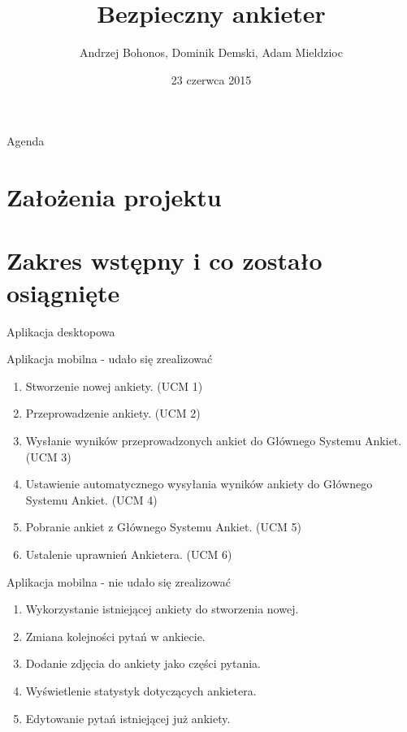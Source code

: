 \documentclass[a4paper,10pt]{beamer}
\date{23 czerwca 2015}
\title{Bezpieczny ankieter}
\author[A. Bohonos, D. Demski, A. Mieldzioc]{Andrzej Bohonos, Dominik Demski, Adam Mieldzioc}
\begin{document}
		\begin{frame}
			\titlepage
		\end{frame}
		\begin{frame}{Agenda}
			\tableofcontents
		\end{frame}
		
		\section{Założenia projektu}
		\begin{frame}
		
		\end{frame}
	
		\section{Zakres wstępny i co zostało osiągnięte}
	
		\begin{frame}{Aplikacja desktopowa}
		\end{frame}
	
		\begin{frame}{Aplikacja mobilna - udało się zrealizować}
			\begin{enumerate}
				\item Stworzenie nowej ankiety. (UCM 1)
				\item	Przeprowadzenie ankiety. (UCM 2)
				\item	Wysłanie wyników przeprowadzonych ankiet do Głównego Systemu Ankiet. (UCM 3)
				\item	Ustawienie automatycznego wysyłania wyników ankiety do Głównego Systemu Ankiet. (UCM 4)
				\item	Pobranie ankiet z Głównego Systemu Ankiet. (UCM 5)
				\item	Ustalenie uprawnień Ankietera. (UCM 6)	
			\end{enumerate}
		\end{frame}
		
		\begin{frame}{Aplikacja mobilna - nie udało się zrealizować}
			\begin{enumerate}
				\item	Wykorzystanie istniejącej ankiety do stworzenia nowej.
				\item	Zmiana kolejności pytań w ankiecie.
				\item	Dodanie zdjęcia do ankiety jako części pytania.
				\item	Wyświetlenie statystyk dotyczących ankietera.
			    \item	Edytowanie pytań istniejącej już ankiety.
			\end{enumerate}
		\end{frame}
		
\end{document}
